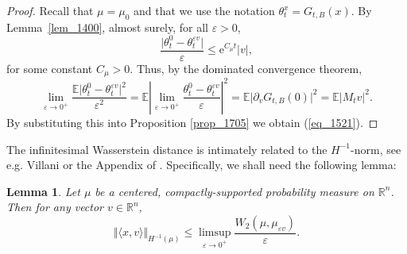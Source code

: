 \documentclass[12pt,a4paper]{article}
\newcommand{\E}{\mathbb{E}}
\newcommand{\e}{\mathrm{e}}
\newcommand{\RR}{\mathbb{R}}
\newcommand{\R}{\mathbb{R}}
\renewcommand{\epsilon}{\varepsilon}
\newtheorem{lemma}[theorem]{Lemma}
\theoremstyle{definition}
\begin{document}
\begin{proof}
Recall that $\mu = \mu_0$ and that we use the notation $\theta_t^x = G_{t,B} (x)$.
By Lemma~\ref{lem_1400}, almost surely, for all  $\epsilon > 0$,
\[
\frac{ \vert \theta_t^0 - \theta_t^{\epsilon v} \vert }{ \epsilon } \leq \e^{C_\mu t} |v|,
\]
for some constant $C_\mu > 0$.
Thus, by the dominated convergence theorem, 
\[
\lim_{\epsilon \to 0^+}
\frac{ \E \vert \theta_t^0 - \theta_t^{\epsilon v} \vert^2 }{\epsilon ^2 } =
 \E \left\vert \lim_{\epsilon \to 0^+} \frac{\theta_t^0 - \theta_t^{\epsilon v}}{\epsilon}  \right\vert^2  = 
 \E \vert \partial_v G_{t,B}(0) \vert^2 =  \E \vert M_t v\vert^2 .
\]
By substituting this into Proposition \ref{prop_1705} we obtain (\ref{eq_1521}). 
\end{proof}

The infinitesimal Wasserstein distance
is intimately related to the $H^{-1}$-norm,
see e.g. Villani \cite[Section 7.6]{Vil} or the Appendix of \cite{K_ptrf}.
Specifically, we shall need the following lemma:

\begin{lemma}\label{lem_villani} Let $\mu$ be a centered, compactly-supported
probability measure on $\RR^n$. Then for any vector $v\in \R^n$,
\[
\Vert \langle x ,v\rangle \Vert_{H^{-1} (\mu) }
\leq \limsup_{\epsilon \to 0^+} \frac{ W_2 ( \mu , \mu_{\epsilon v} ) }{\epsilon} .
\]
\end{lemma}
\end{document}
